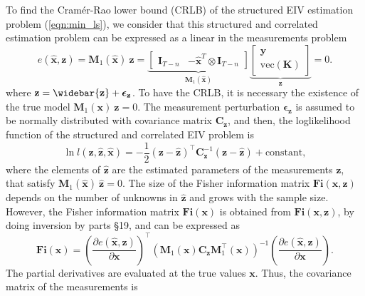To find the Cram\'er-Rao lower bound (CRLB) of the structured EIV estimation problem (\ref{eqn:min_ls}), we consider that this structured and correlated estimation problem can be expressed as a linear in the measurements problem \cite{Pintelon12Book}
\begin{equation} e (\widehat{\mathbf{x}}, \mathbf{z}) = \mathbf{M}_1( \widehat{\mathbf{x}} ) \ \mathbf{z} = \underbrace{\begin{bmatrix} \mathbf{I}_{T-n} & - \widehat{\mathbf{x}}^T \otimes \mathbf{I}_{T-n} \end{bmatrix}}_{\mathbf{M}_1( \widehat{\mathbf{x}} )} \underbrace{\begin{bmatrix} \mathbf{y} \\ \mathrm{vec} ( \mathbf{K} ) \end{bmatrix}}_{\mathbf{z}} = 0 . \label{eqn:M1vecyK} \end{equation}
where $\mathbf{z} = \widebar{\mathbf{z}} + \bm{\epsilon}_{\mathbf{z}}$.
To have the CRLB, it is necessary the existence of the true model $\mathbf{M}_1( \mathbf{x} ) \ \mathbf{z} = 0$.
The measurement perturbation $\bm{\epsilon}_{\mathbf{z}}$ is assumed to be normally distributed with covariance matrix $\mathbf{C}_{\mathbf{z}}$, and then, the loglikelihood function of the structured and correlated EIV problem is
\begin{equation} \ln{ l(\mathbf{z}, \widehat{\mathbf{z}}, \widehat{\mathbf{x}}) } = - \frac{1}{2} \left( \mathbf{z} - \widehat{\mathbf{z}} \right)^\top \mathbf{C}_{\mathbf{z}}^{-1} \left( \mathbf{z} - \widehat{\mathbf{z}} \right) + \mathrm{constant}, \end{equation}
where the elements of $\widehat{\mathbf{z}}$ are the estimated parameters of the measurements $\mathbf{z}$,  that satisfy $\mathbf{M}_1(\widehat{\mathbf{x}}) \ \widehat{\mathbf{z}} = 0$.
The size of the Fisher information matrix $\mathbf{Fi}(\mathbf{x}, \mathbf{z})$ depends on the number of unknowns in $\widehat{\mathbf{z}}$ and grows with the sample size.
However, the Fisher information matrix $\mathbf{Fi}(\mathbf{x})$ is obtained from $\mathbf{Fi}(\mathbf{x}, \mathbf{z})$, by doing inversion by parts \cite{Pintelon12Book} \S 19, and can be expressed as  
\begin{equation} \mathbf{Fi}(\mathbf{x}) = \left( \frac{\partial e (\widehat{\mathbf{x}}, \mathbf{z}) }{\partial \mathbf{x} } \right)^\top \left( \mathbf{M}_1( \mathbf{x} ) \mathbf{C}_{\mathbf{z}}  \mathbf{M}_1^\top( \mathbf{x} ) \right)^{-1}  \left( \frac{\partial e (\widehat{\mathbf{x}}, \mathbf{z}) }{\partial \mathbf{x} } \right) .
 \label{eqn:FIM}   \end{equation} 
The partial derivatives are evaluated at the true values $\mathbf{x}$. 
Thus, the covariance matrix of the measurements is

